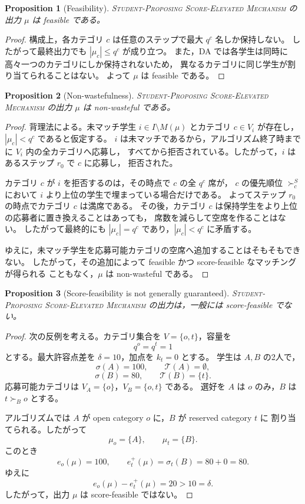 \documentclass[
  12pt,
  a4paper,
  oneside,
  onecolumn,
  titlepage,
  final
]{jsarticle}
\newtheorem{proposition}{Proposition}
\newcommand{\1}{\mathbf{1}}
\begin{document}
\begin{proposition}[Feasibility]
\label{prop:se-feasible}
\textsc{Student-Proposing Score-Elevated Mechanism} の出力 $\mu$ は feasible である。
\end{proposition}

\begin{proof}
構成上，各カテゴリ $c$ は任意のステップで最大 $q^c$ 名しか保持しない。
したがって最終出力でも $|\mu_c|\le q^c$ が成り立つ。
また，DA では各学生は同時に高々一つのカテゴリにしか保持されないため，
異なるカテゴリに同じ学生が割り当てられることはない。
よって $\mu$ は feasible である。
\end{proof}

\begin{proposition}[Non-wastefulness]
\label{prop:se-nonwasteful}
\textsc{Student-Proposing Score-Elevated Mechanism} の出力 $\mu$ は non-wasteful である。
\end{proposition}

\begin{proof}
背理法による。未マッチ学生 $i\in I\setminus M(\mu)$ とカテゴリ $c\in V_i$ が存在し，
$|\mu_c|<q^c$ であると仮定する。
$i$ は未マッチであるから，アルゴリズム終了時までに $V_i$ 内の全カテゴリへ応募し，
すべてから拒否されている。したがって，$i$ はあるステップ $r_0$ で $c$ に応募し，
拒否された。

カテゴリ $c$ が $i$ を拒否するのは，その時点で $c$ の全 $q^c$ 席が，
$c$ の優先順位 $\succ_c^S$ において $i$ より上位の学生で埋まっている場合だけである。
よってステップ $r_0$ の時点でカテゴリ $c$ は満席である。
その後，カテゴリ $c$ は保持学生をより上位の応募者に置き換えることはあっても，
席数を減らして空席を作ることはない。
したがって最終的にも $|\mu_c|=q^c$ であり，$|\mu_c|<q^c$ に矛盾する。

ゆえに，未マッチ学生を応募可能カテゴリの空席へ追加することはそもそもできない。
したがって，その追加によって feasible かつ score-feasible なマッチングが得られる
こともなく，$\mu$ は non-wasteful である。
\end{proof}

\begin{proposition}[Score-feasibility is not generally guaranteed]
\label{prop:se-score-feasibility-not-guaranteed}
\textsc{Student-Proposing Score-Elevated Mechanism} の出力は，一般には score-feasible でない。
\end{proposition}

\begin{proof}
次の反例を考える。カテゴリ集合を $V=\{o,t\}$，容量を
\[
    q^o=q^t=1
\]
とする。最大許容点差を $\delta=10$，加点を $k_t=0$ とする。
学生は $A,B$ の2人で，
\[
    \sigma(A)=100,\qquad \mathcal T(A)=\emptyset,
\]
\[
    \sigma(B)=80,\qquad \mathcal T(B)=\{t\}.
\]
応募可能カテゴリは $V_A=\{o\}$，$V_B=\{o,t\}$ である。
選好を $A$ は $o$ のみ，$B$ は $t\succ_B o$ とする。

アルゴリズムでは $A$ が open category $o$ に，$B$ が reserved category $t$ に
割り当てられる。したがって
\[
    \mu_o=\{A\},\qquad \mu_t=\{B\}.
\]
このとき
\[
    e_o(\mu)=100,
    \qquad
    e_t^+(\mu)=\sigma_t(B)=80+0=80.
\]
ゆえに
\[
    e_o(\mu)-e_t^+(\mu)=20>10=\delta.
\]
したがって，出力 $\mu$ は score-feasible ではない。
\end{proof}
\end{document}
